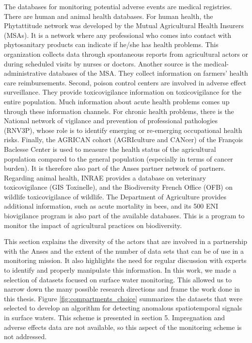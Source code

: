 The databases for monitoring potential adverse events are medical registries. There are human and animal health databases. For human health, the Phytattitude network was developed by the Mutual Agricultural Health Insurers (MSAs). It is a network where any professional who comes into contact with phytosanitary products can indicate if he/she has health problems. This organization collects data through spontaneous reports from agricultural actors or during scheduled visits by nurses or doctors. Another source is the medical-administrative databases of the MSA. They collect information on farmers' health care reimbursements. Second, poison control centers are involved in adverse effect surveillance. They provide toxicovigilance information on toxicovigilance for the entire population. Much information about acute health problems comes up through these information channels. For chronic health problems, there is the National network of vigilance and prevention of professional pathologies (RNV3P), whose role is to identify emerging or re-emerging occupational health risks. Finally, the AGRICAN cohort (AGRIculture and CANcer) of the François Baclesse Center is used to measure the health status of the agricultural population compared to the general population (especially in terms of cancer burden). It is therefore also part of the Anses partner network of partners. Regarding animal health, INRAE provides a database on veterinary toxicovigilance (GIS Toxinelle), and the Biodiversity French Office (OFB) on wildlife toxicovigilance of wildlife. The Department of Agriculture provides additional information, such as acute mortality in bees, and its 500 ENI biovigilance program is also part of the available databases. This is a program to monitor the impact of agricultural practices on biodiversity.

This section explains the diversity of the actors that are involved in a partnership with the Anses and the extent of the number of data sets that can be of use in a monitoring mission. It also highlights the need for regular discussion with experts to identify and properly manipulate this information. In this work, we made a selection of datasets focused on surface water monitoring. This allowed us to narrow down the many possible research directions and frame the work done in this thesis. Figure \ref{fig:compartments_choice} summarizes the datasets that were selected to develop an algorithm for detecting anomalous spatiotemporal signals in surface waters. This scheme is presented in section 5. Impregnation and adverse effects data are not available, so this aspect of the monitoring scheme is not addressed.

